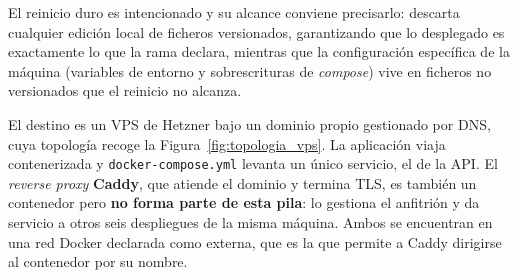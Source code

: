 El reinicio duro es intencionado y su alcance conviene precisarlo: descarta cualquier edición local de ficheros versionados, garantizando que lo desplegado es exactamente lo que la rama declara, mientras que la configuración específica de la máquina (variables de entorno y sobrescrituras de \textit{compose}) vive en ficheros no versionados que el reinicio no alcanza.

El destino es un VPS de Hetzner bajo un dominio propio gestionado por DNS, cuya topología recoge la Figura~\ref{fig:topologia_vps}. La aplicación viaja contenerizada y \texttt{docker-compose.yml} levanta un único servicio, el de la API. El \textit{reverse proxy} \textbf{Caddy}, que atiende el dominio y termina TLS, es también un contenedor pero \textbf{no forma parte de esta pila}: lo gestiona el anfitrión y da servicio a otros seis despliegues de la misma máquina. Ambos se encuentran en una red Docker declarada como externa, que es la que permite a Caddy dirigirse al contenedor por su nombre.



